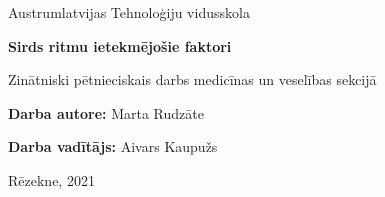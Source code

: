 \documentclass[12pt]{article}
\begin{document}
\begin{titlepage}
   \begin{center}
       \vspace*{1cm}

       \Large Austrumlatvijas Tehnoloģiju vidusskola
            
       \vspace{8cm}

       \textbf{\huge Sirds ritmu ietekmējošie faktori}\
       
       \vspace{1cm}
       
       \Large Zinātniski pētnieciskais darbs medicīnas un veselības sekcijā
       
       \vspace{2cm}
       
       \end{center}   
\begin{flushright}
\Large \textbf{Darba autore:} Marta Rudzāte 

\Large \textbf{Darba vadītājs:} Aivars Kaupužs
\end{flushright}

    \begin{center}

       \vfill
        
       \vspace{0.8cm}
    
       \Large Rēzekne, 2021
            
    \end{center}
\end{titlepage}
\end{document}
